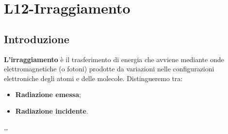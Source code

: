 \section{L12-Irraggiamento}
\subsection{Introduzione}
\textbf{L’irraggiamento} è il trasferimento di energia che avviene
mediante onde elettromagnetiche (o fotoni) prodotte da
variazioni nelle configurazioni elettroniche degli atomi e
delle molecole.\newline
\newline
Distingueremo tra:
\begin{itemize}
    \item \textbf{Radiazione emessa};
    \item \textbf{Radiazione incidente}.
\end{itemize}
\dots